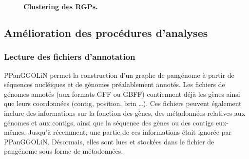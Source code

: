 \begin{figure}[htbp]
    \centering
    \hfill
    \caption[Clustering des RGPs]{\textbf{Clustering des RGPs.}}
    \label{fig:rgpcluster}
\end{figure}

\subsection{Amélioration des procédures d'analyses}

\subsubsection{Lecture des fichiers d'annotation}

PPanGGOLiN permet la construction d'un graphe de pangénome à partir de séquences nucléiques et de génomes préalablement annotés. Les fichiers de génomes annotés (aux formats GFF ou GBFF) contiennent déjà les gènes ainsi que leurs coordonnées (contig, position, brin \dots). Ces fichiers peuvent également inclure des informations sur la fonction des gènes, des métadonnées relatives aux génomes et aux contigs, ainsi que la séquence des gènes ou des contigs eux-mêmes. Jusqu'à récemment, une partie de ces informations était ignorée par PPanGGOLiN. Désormais, elles sont lues et stockées dans le fichier de pangénome sous forme de métadonnées.

